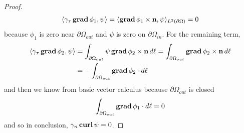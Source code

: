 \documentclass[../master_thesis.tex]{subfiles}
\begin{document}
\begin{proof}
\begin{align*}
        \langle \gamma_\tau \bm{\grad} \phi_1, \psi \rangle 
        = \langle \bm{\grad} \phi_1 \times \mathbf{n}, \psi \rangle_{L^2(\partial \Omega)} = 0
    \end{align*}
    because $\phi_1$ is zero near $\partial \Omega_{out}$ and $\psi$ is zero on 
    $\partial \Omega_{in}$. For the remaining term, 
    \begin{align*}
        \langle \gamma_\tau \bm{\grad} \phi_2, \psi \rangle
        &= \int_{\partial\Omega_{out}} \psi \bm{\grad} \phi_2 \times \mathbf{n} \, d\ell 
        = \int_{\partial\Omega_{out}} \bm{\grad} \phi_2 \times \mathbf{n} \, d\ell 
        \\ &= - \int_{\partial\Omega_{out}} \bm{\grad} \phi_2 \cdot d\ell
    \end{align*}
    and then we know from basic vector calculus because $\partial\Omega_{out}$ is closed
    \begin{align*}
        \int_{\partial\Omega_{out}} \bm{\grad} \phi_1 \cdot d\ell = 0
    \end{align*}
    and so in conclusion, $\gamma_n \veccurl \psi = 0$.
\end{proof}
\end{document}

